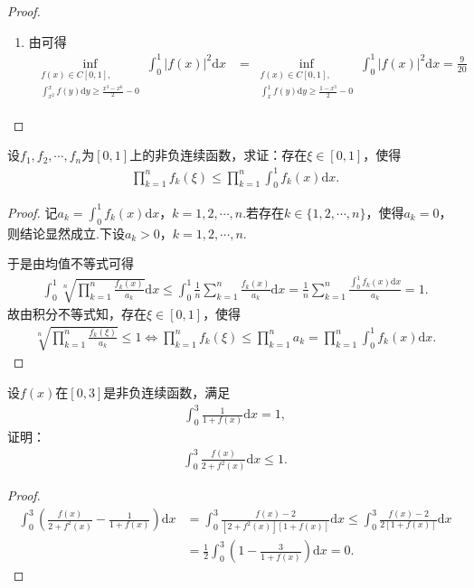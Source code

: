 \documentclass[../../main.tex]{subfiles}%
\begin{document}
\begin{proof}
\begin{enumerate}
\item 由可得
\begin{align*}
\inf_{\substack{f(x) \in C[0,1], \\ \int_{x^2}^x f(y) \mathrm{d}y \geqslant \frac{x^3 - x^6}{2} - 0}} \int_0^1 |f(x)|^2 \mathrm{d}x &= \inf_{\substack{f(x) \in C[0,1], \\ \int_x^1 f(y) \mathrm{d}y \geqslant \frac{1 - x^3}{2} - 0}} \int_0^1 |f(x)|^2 \mathrm{d}x = \frac{9}{20}
\end{align*}
\end{enumerate}
\end{proof}

\begin{example}
设$f_1,f_2,\cdots,f_n$为$[0,1]$上的非负连续函数，求证：存在$\xi \in [0,1]$，使得
\begin{align*}
\prod_{k=1}^n f_k(\xi) \leqslant \prod_{k=1}^n \int_0^1 f_k(x)\mathrm{d}x.
\end{align*}
\end{example}
\begin{proof}
记$a_k=\int_0^1 f_k(x)\mathrm{d}x$，$k=1,2,\cdots,n$.若存在$k\in \{1,2,\cdots,n\}$，使得$a_k=0$，则结论显然成立.下设$a_k>0$，$k=1,2,\cdots,n$.

于是由均值不等式可得
\begin{align*}
\int_0^1 \sqrt[n]{\prod_{k=1}^n \frac{f_k(x)}{a_k}} \mathrm{d}x \leqslant \int_0^1 \frac{1}{n}\sum_{k=1}^n \frac{f_k(x)}{a_k} \mathrm{d}x = \frac{1}{n}\sum_{k=1}^n \frac{\int_0^1 f_k(x)\mathrm{d}x}{a_k} = 1.
\end{align*}
故由积分不等式知，存在$\xi \in [0,1]$，使得
\begin{align*}
\sqrt[n]{\prod_{k=1}^n \frac{f_k(\xi)}{a_k}} \leqslant 1 \Longleftrightarrow \prod_{k=1}^n f_k(\xi) \leqslant \prod_{k=1}^n a_k = \prod_{k=1}^n \int_0^1 f_k(x)\mathrm{d}x.
\end{align*}
\end{proof}

\begin{example}
设$f(x)$在$[0,3]$是非负连续函数，满足
\begin{align*}
\int_{0}^{3} \frac{1}{1+f(x)}\mathrm{d}x = 1,
\end{align*}
证明：
\begin{align*}
\int_{0}^{3} \frac{f(x)}{2+f^2(x)}\mathrm{d}x \leqslant 1.
\end{align*}
\end{example}
\begin{proof}
\begin{align*}
\int_0^3{\left( \frac{f\left( x \right)}{2+f^2\left( x \right)}-\frac{1}{1+f\left( x \right)} \right) \mathrm{d}x}&=\int_0^3{\frac{f\left( x \right) -2}{\left[ 2+f^2\left( x \right) \right] \left[ 1+f\left( x \right) \right]}\mathrm{d}x}\leqslant \int_0^3{\frac{f\left( x \right) -2}{2\left[ 1+f\left( x \right) \right]}\mathrm{d}x}
\\
&=\frac{1}{2}\int_0^3{\left( 1-\frac{3}{1+f\left( x \right)} \right) \mathrm{d}x}=0.
\end{align*}
\end{proof}
\end{document}
